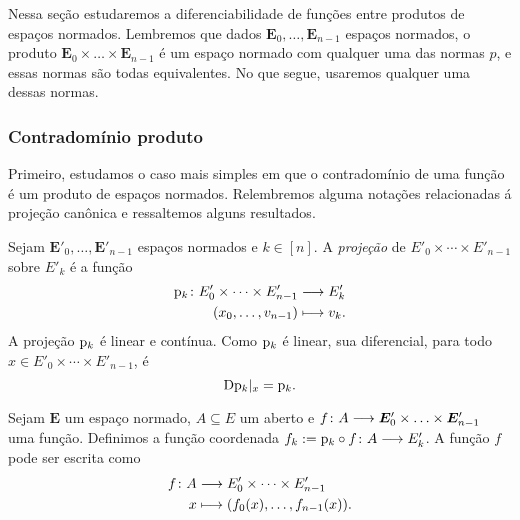 Nessa seção estudaremos a diferenciabilidade de funções entre produtos de espaços normados. Lembremos que dados $\bm E_0, \ldots, \bm E_{n-1}$ espaços normados, o produto $\bm E_0 \times \ldots \times \bm E_{n-1}$ é um espaço normado com qualquer uma das normas $p$, e essas normas são todas equivalentes. No que segue, usaremos qualquer uma dessas normas.

\subsubsection{Contradomínio produto}

Primeiro, estudamos o caso mais simples em que o contradomínio de uma função é um produto de espaços normados. Relembremos alguma notações relacionadas á projeção canônica e ressaltemos alguns resultados.

Sejam $\bm E'_0, \ldots, \bm E'_{n-1}$ espaços normados e $k \in [n]$. A \emph{projeção} de $E'_0 \times \cdots \times E'_{n-1}$ sobre $E'_k$ é a função
	\begin{align*}
	{\mathrm{p}_k}\colon {E'_0 \times \cdots \times E'_{n-1}} &\longrightarrow {E'_k} \\{(x_0,\ldots,v_{n-1})} &\longmapsto v_k.
	\end{align*}
A projeção $\mathrm{p}_k$ é linear e contínua. Como $\mathrm{p}_k$ é linear, sua diferencial, para todo $x \in E'_0 \times \cdots \times E'_{n-1}$, é
	\begin{equation*}
	\mathrm{D} \mathrm{p}_k|_x = \mathrm{p}_k.
	\end{equation*}

Sejam $\bm E$ um espaço normado, $A \subseteq E$ um aberto e ${f}\colon {A} \longrightarrow {\bm E'_0 \times \ldots \times \bm E'_{n-1}}$ uma função. Definimos a função coordenada $f_k := {\mathrm{p}_k \circ f}\colon {A} \longrightarrow {E'_k}$. A função $f$ pode ser escrita como
	\begin{align*}
	{f}\colon {A} &\longrightarrow {E'_0 \times \cdots \times E'_{n-1}} \\{x} &\longmapsto (f_0(x), \ldots, f_{n-1}(x)).
	\end{align*}

